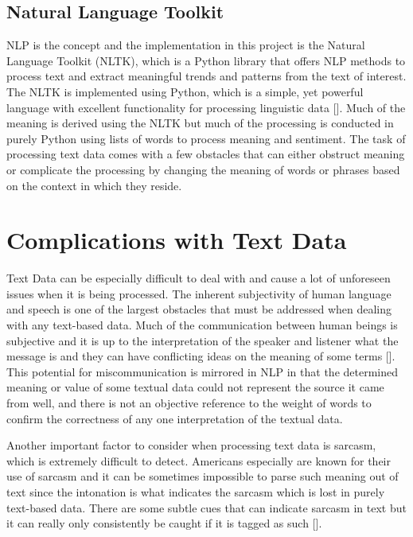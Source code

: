 \subsection{Natural Language Toolkit}
NLP is the concept and the implementation in this project is the Natural Language Toolkit (NLTK), which is a Python library that offers NLP methods to process text and extract meaningful trends and patterns from the text of interest.
The NLTK is implemented using Python, which is a simple, yet powerful language with excellent functionality for processing linguistic data [\cite{bird2004nltk}].
Much of the meaning is derived using the NLTK but much of the processing is conducted in purely Python using lists of words to process meaning and sentiment.
The task of processing text data comes with a few obstacles that can either obstruct meaning or complicate the processing by changing the meaning of words or phrases based on the context in which they reside.

\section{Complications with Text Data}
Text Data can be especially difficult to deal with and cause a lot of unforeseen issues when it is being processed.
The inherent subjectivity of human language and speech is one of the largest obstacles that must be addressed when dealing with any text-based data.
Much of the communication between human beings is subjective and it is up to the interpretation of the speaker and listener what the message is and they can have conflicting ideas on the meaning of some terms [\cite{aggarwal2012mining}].
This potential for miscommunication is mirrored in NLP in that the determined meaning or value of some textual data could not represent the source it came from well, and there is not an objective reference to the weight of words to confirm the correctness of any one interpretation of the textual data.

Another important factor to consider when processing text data is sarcasm, which is extremely difficult to detect.
Americans especially are known for their use of sarcasm and it can be sometimes impossible to parse such meaning out of text since the intonation is what indicates the sarcasm which is lost in purely text-based data.
There are some subtle cues that can indicate sarcasm in text but it can really only consistently be caught if it is tagged as such [\cite{riloff2013sarcasm}].

